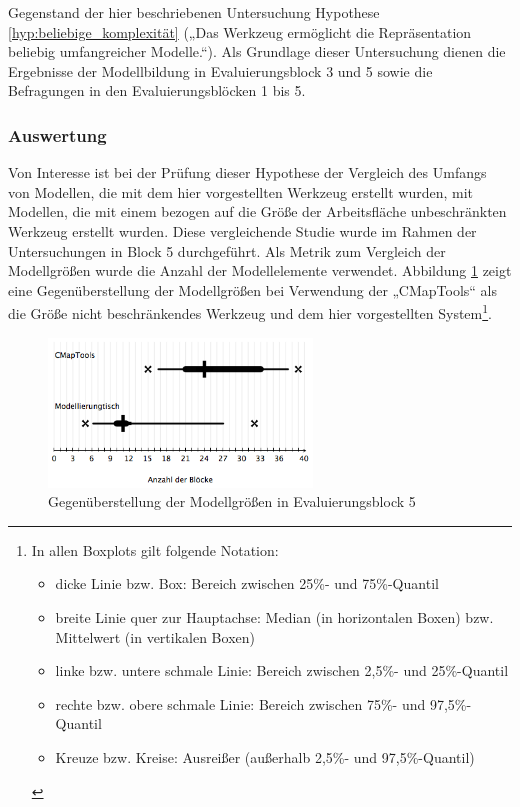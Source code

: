 Gegenstand der hier beschriebenen Untersuchung Hypothese \ref{hyp:beliebige_komplexität} („Das Werkzeug ermöglicht die Repräsentation beliebig umfangreicher Modelle.“). Als Grundlage dieser Untersuchung dienen die Ergebnisse der Modellbildung in Evaluierungsblock 3 und 5 sowie die Befragungen in den Evaluierungsblöcken 1 bis 5.

\subsubsection{Auswertung} %

Von Interesse ist bei der Prüfung dieser Hypothese der Vergleich des Umfangs von Modellen, die mit dem hier vorgestellten Werkzeug erstellt wurden, mit Modellen, die mit einem bezogen auf die Größe der Arbeitsfläche unbeschränkten Werkzeug erstellt wurden. Diese vergleichende Studie wurde im Rahmen der Untersuchungen in Block 5 durchgeführt. Als Metrik zum Vergleich der Modellgrößen wurde die Anzahl der Modellelemente verwendet. Abbildung \ref{fig:img_Evaluierung_ElementeConceptMapping2} zeigt eine Gegenüberstellung der Modellgrößen bei Verwendung der „CMapTools“ als die Größe nicht beschränkendes Werkzeug und dem hier vorgestellten System\footnote{In allen Boxplots gilt folgende Notation: 
\begin{itemize}
	\item dicke Linie bzw. Box: Bereich zwischen 25\%- und 75\%-Quantil
	\item breite Linie quer zur Hauptachse: Median (in horizontalen Boxen) bzw. Mittelwert (in vertikalen Boxen)
	\item linke bzw. untere schmale Linie: Bereich zwischen 2,5\%- und 25\%-Quantil
	\item rechte bzw. obere schmale Linie: Bereich zwischen 75\%- und 97,5\%-Quantil
	\item Kreuze bzw. Kreise: Ausreißer (außerhalb 2,5\%- und 97,5\%-Quantil)
\end{itemize}
}.

\begin{figure}[htbp]
	\centering
		\includegraphics[width=7cm]{img/Evaluierung/ElementeConceptMapping2.png}
	\caption{Gegenüberstellung der Modellgrößen in Evaluierungsblock 5}
	\label{fig:img_Evaluierung_ElementeConceptMapping2}
\end{figure}

